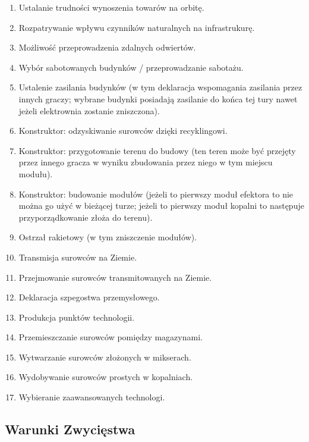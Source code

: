 \documentclass[11pt,a4paper]{article}
\begin{document}
\begin{enumerate}
  \setlength{\parskip}{0pt}
  \setlength{\itemsep}{0pt plus 1pt}
\item Ustalanie trudności wynoszenia towarów na orbitę.
\item Rozpatrywanie wpływu czynników naturalnych na infrastrukurę.
\item Możliwość przeprowadzenia zdalnych odwiertów.
\item Wybór sabotowanych budynków / przeprowadzanie sabotażu.
\item Ustalenie zasilania budynków (w tym deklaracja wspomagania zasilania przez innych graczy; wybrane budynki posiadają zasilanie do końca tej tury nawet jeżeli elektrownia zostanie zniszczona).
\item Konstruktor: odzyskiwanie surowców dzięki recyklingowi.
\item Konstruktor: przygotowanie terenu do budowy (ten teren może być przejęty przez innego gracza w wyniku zbudowania przez niego w tym miejscu modułu).
\item Konstruktor: budowanie modułów (jeżeli to pierwszy moduł efektora to nie można go użyć w bieżącej turze; jeżeli to pierwszy moduł kopalni to następuje przyporządkowanie złoża do terenu).
\item Ostrzał rakietowy (w tym zniszczenie modułów).
\item Transmisja surowców na Ziemie.
\item Przejmowanie surowców transmitowanych na Ziemie.
\item Deklaracja szpegostwa przemysłowego.
\item Produkcja punktów technologii.
\item Przemieszczanie surowców pomiędzy magazynami.
\item Wytwarzanie surowców złożonych w mikserach.
\item Wydobywanie surowców prostych w kopalniach.
\item Wybieranie zaawansowanych technologi.
\end{enumerate}

\subsection{Warunki Zwycięstwa}
\end{document}
